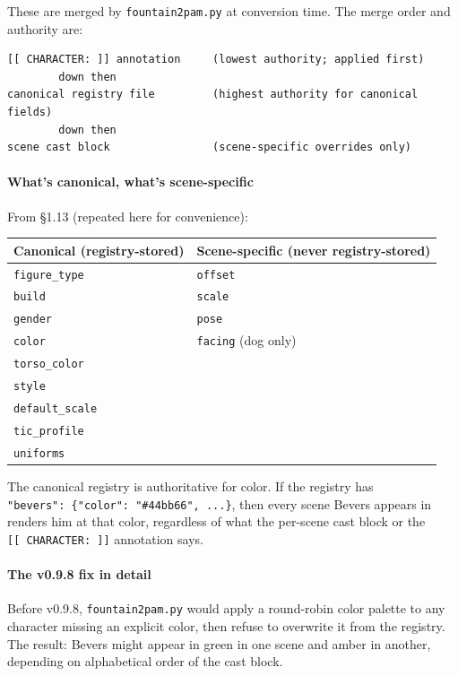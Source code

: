 \documentclass[
  11pt,
]{book}
\begin{document}
These are merged by \texttt{fountain2pam.py} at conversion time. The
merge order and authority are:

\begin{verbatim}
[[ CHARACTER: ]] annotation     (lowest authority; applied first)
        down then
canonical registry file         (highest authority for canonical fields)
        down then
scene cast block                (scene-specific overrides only)
\end{verbatim}

\paragraph{What's canonical, what's
scene-specific}\label{whats-canonical-whats-scene-specific}

From §1.13 (repeated here for convenience):

\begin{longtable}[]{@{}ll@{}}
\toprule\noalign{}
Canonical (registry-stored) & Scene-specific (never registry-stored) \\
\midrule\noalign{}
\endhead
\bottomrule\noalign{}
\endlastfoot
\texttt{figure\_type} & \texttt{offset} \\
\texttt{build} & \texttt{scale} \\
\texttt{gender} & \texttt{pose} \\
\texttt{color} & \texttt{facing} (dog only) \\
\texttt{torso\_color} & \\
\texttt{style} & \\
\texttt{default\_scale} & \\
\texttt{tic\_profile} & \\
\texttt{uniforms} & \\
\end{longtable}

The canonical registry is authoritative for color. If the registry has
\texttt{"bevers":\ \{"color":\ "\#44bb66",\ ...\}}, then every scene
Bevers appears in renders him at that color, regardless of what the
per-scene cast block or the \texttt{{[}{[}\ CHARACTER:\ {]}{]}}
annotation says.

\paragraph{The v0.9.8 fix in detail}\label{the-v0.9.8-fix-in-detail}

Before v0.9.8, \texttt{fountain2pam.py} would apply a round-robin color
palette to any character missing an explicit color, then refuse to
overwrite it from the registry. The result: Bevers might appear in green
in one scene and amber in another, depending on alphabetical order of
the cast block.
\end{document}
